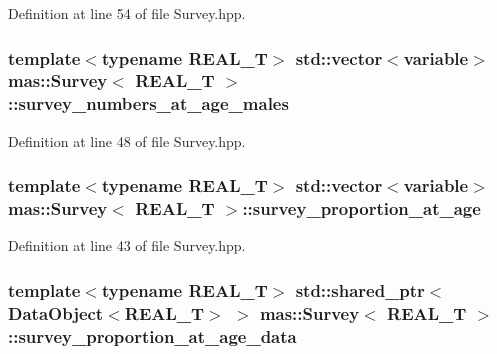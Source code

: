 Definition at line 54 of file Survey.\-hpp.

\hypertarget{structmas_1_1_survey_a2727239747456825885406d15a07c08d}{
\subsubsection[{survey\-\_\-numbers\-\_\-at\-\_\-age\-\_\-males}]{\setlength{\rightskip}{0pt plus 5cm}template$<$typename R\-E\-A\-L\-\_\-\-T$>$ std\-::vector$<${\bf variable}$>$ {\bf mas\-::\-Survey}$<$ R\-E\-A\-L\-\_\-\-T $>$\-::survey\-\_\-numbers\-\_\-at\-\_\-age\-\_\-males}}\label{structmas_1_1_survey_a2727239747456825885406d15a07c08d}


Definition at line 48 of file Survey.\-hpp.

\hypertarget{structmas_1_1_survey_aea931b487380dc2188543c50c50e101c}{
\subsubsection[{survey\-\_\-proportion\-\_\-at\-\_\-age}]{\setlength{\rightskip}{0pt plus 5cm}template$<$typename R\-E\-A\-L\-\_\-\-T$>$ std\-::vector$<${\bf variable}$>$ {\bf mas\-::\-Survey}$<$ R\-E\-A\-L\-\_\-\-T $>$\-::survey\-\_\-proportion\-\_\-at\-\_\-age}}\label{structmas_1_1_survey_aea931b487380dc2188543c50c50e101c}


Definition at line 43 of file Survey.\-hpp.

\hypertarget{structmas_1_1_survey_abe5be20bcd63fb69b91008672bcb76ff}{
\subsubsection[{survey\-\_\-proportion\-\_\-at\-\_\-age\-\_\-data}]{\setlength{\rightskip}{0pt plus 5cm}template$<$typename R\-E\-A\-L\-\_\-\-T$>$ std\-::shared\-\_\-ptr$<${\bf Data\-Object}$<$R\-E\-A\-L\-\_\-\-T$>$ $>$ {\bf mas\-::\-Survey}$<$ R\-E\-A\-L\-\_\-\-T $>$\-::survey\-\_\-proportion\-\_\-at\-\_\-age\-\_\-data}}\label{structmas_1_1_survey_abe5be20bcd63fb69b91008672bcb76ff}


